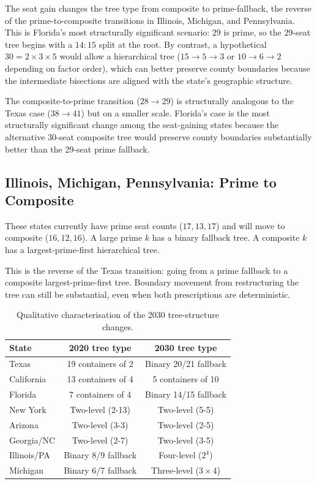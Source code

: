 The seat gain changes the tree type from composite to prime-fallback,
the reverse of the prime-to-composite transitions in Illinois, Michigan,
and Pennsylvania.
This is Florida's most structurally significant scenario: 29 is prime,
so the 29-seat tree begins with a $14:15$ split at the root.
By contrast, a hypothetical $30 = 2 \times 3 \times 5$ would allow a
hierarchical tree ($15 \to 5 \to 3$ or $10 \to 6 \to 2$ depending on
factor order), which can better preserve county boundaries because the
intermediate bisections are aligned with the state's geographic structure.

The composite-to-prime transition ($28 \to 29$) is structurally analogous
to the Texas case ($38 \to 41$) but on a smaller scale.
Florida's case is the most structurally significant change among the
seat-gaining states because the alternative 30-seat composite tree would
preserve county boundaries substantially better than the 29-seat prime
fallback.

\subsection{Illinois, Michigan, Pennsylvania: Prime to Composite}

These states currently have prime seat counts ($17, 13, 17$) and will
move to composite ($16, 12, 16$).
A large prime $k$ has a binary fallback tree.
A composite $k$ has a largest-prime-first hierarchical tree.

This is the reverse of the Texas transition: going from a prime fallback to a
composite largest-prime-first tree.  Boundary movement from restructuring the
tree can still be substantial, even when both prescriptions are deterministic.

\begin{table}[h]
\centering
\caption{Qualitative characterisation of the 2030 tree-structure changes.}
\label{tab:tree-changes}
\begin{tabular}{lcc}
\toprule
State & 2020 tree type & 2030 tree type \\
\midrule
Texas & 19 containers of 2 & Binary 20/21 fallback \\
California & 13 containers of 4 & 5 containers of 10 \\
Florida & 7 containers of 4 & Binary 14/15 fallback \\
New York & Two-level (2-13) & Two-level (5-5) \\
Arizona & Two-level (3-3) & Two-level (2-5) \\
Georgia/NC & Two-level (2-7) & Two-level (3-5) \\
Illinois/PA & Binary 8/9 fallback & Four-level ($2^4$) \\
Michigan & Binary 6/7 fallback & Three-level ($3 \times 4$) \\
\bottomrule
\end{tabular}
\end{table}
